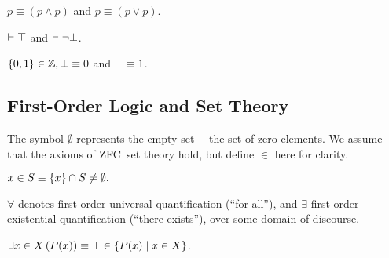 \begin{definition}[Tautologies]
  $p\equiv (p\land p)$ and $p\equiv (p\lor p)$.
\end{definition}

%
%
\begin{definition}
  $\vdash\top$ and $\vdash\neg\bot$.
\end{definition}

\indexsym{}
%
\begin{definition}
  $\left\{0,1\right\}\in\mathbb{Z}, \bot \equiv 0$ and $\top \equiv 1$.
\end{definition}


\subsection{First-Order Logic and Set Theory}
\indexsym{}
The symbol $\emptyset$ represents the empty set---%
  the set of zero elements.
We assume that the axioms of ZFC~set theory hold,
  but define $\in$ here for clarity.

\indexsym{}
\indexsym{}
\indexsym{}
\begin{definition}
  $x \in S \equiv \left\{x\right\} \cap S \not= \emptyset.$
\end{definition}

$\forall$ denotes first-order universal quantification (``for all''),
  and $\exists$ first-order existential quantification (``there exists''),
  over some domain of discourse.

\indexsym{}
\begin{definition}
  $\Exists{x\in X}{P(x)} \equiv
    \true \in \Set{P(x) \mid x\in X}$.
\end{definition}


